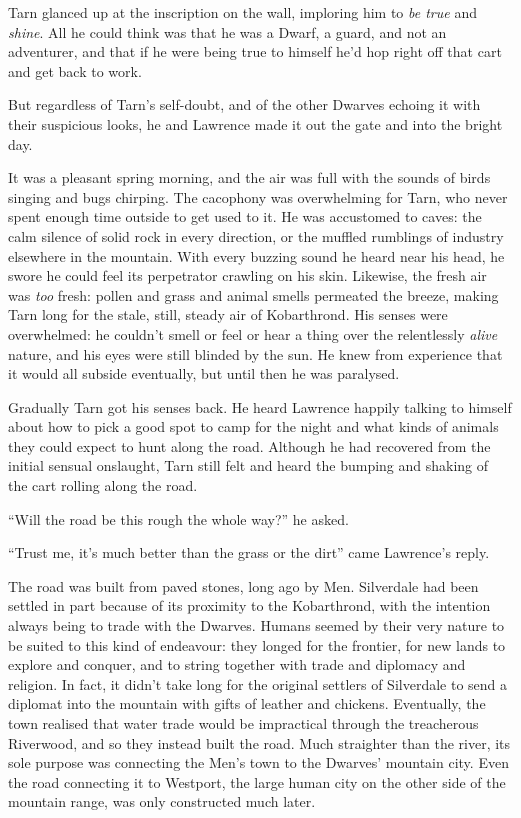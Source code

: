 Tarn glanced up at the inscription on the wall, imploring him to \emph{be true} and \emph{shine}.  All he could think was that he was a Dwarf, a guard, and not an adventurer, and that if he were being true to himself he'd hop right off that cart and get back to work.  

But regardless of Tarn's self-doubt, and of the other Dwarves echoing it with their suspicious looks, he and Lawrence made it out the gate and into the bright day.

It was a pleasant spring morning, and the air was full with the sounds of birds singing and bugs chirping.  The cacophony was overwhelming for Tarn, who never spent enough time outside to get used to it.  He was accustomed to caves: the calm silence of solid rock in every direction, or the muffled rumblings of industry elsewhere in the mountain.  With every buzzing sound he heard near his head, he swore he could feel its perpetrator crawling on his skin.  Likewise, the fresh air was \emph{too} fresh: pollen and grass and animal smells permeated the breeze, making Tarn long for the stale, still, steady air of Kobarthrond.  His senses were overwhelmed: he couldn't smell or feel or hear a thing over the relentlessly \emph{alive} nature, and his eyes were still blinded by the sun.  He knew from experience that it would all subside eventually, but until then he was paralysed.

Gradually Tarn got his senses back.  He heard Lawrence happily talking to himself about how to pick a good spot to camp for the night and what kinds of animals they could expect to hunt along the road.  Although he had recovered from the initial sensual onslaught, Tarn still felt and heard the bumping and shaking of the cart rolling along the road.

``Will the road be this rough the whole way?'' he asked.

``Trust me, it's much better than the grass or the dirt'' came Lawrence's reply.

The road was built from paved stones, long ago by Men.  Silverdale had been settled in part because of its proximity to the Kobarthrond, with the intention always being to trade with the Dwarves.  Humans seemed by their very nature to be suited to this kind of endeavour: they longed for the frontier, for new lands to explore and conquer, and to string together with trade and diplomacy and religion.  In fact, it didn't take long for the original settlers of Silverdale to send a diplomat into the mountain with gifts of leather and chickens.  Eventually, the town realised that water trade would be impractical through the treacherous Riverwood, and so they instead built the road.  Much straighter than the river, its sole purpose was connecting the Men's town to the Dwarves' mountain city.  Even the road connecting it to Westport, the large human city on the other side of the mountain range, was only constructed much later.

